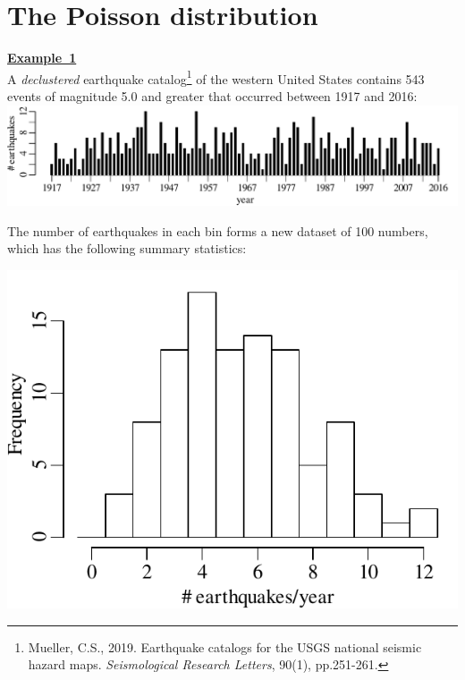 \chapter{The Poisson distribution}
\label{ch:poisson}

\textbf{\underline{Example~1}}\\

A \emph{declustered} earthquake catalog\footnote{Mueller, C.S.,
  2019. Earthquake catalogs for the USGS national seismic hazard
  maps. \textit{Seismological Research Letters}, 90(1), pp.251-261.}
of the western United States contains 543 events of magnitude 5.0 and
greater that occurred between 1917 and 2016:\\

\noindent\includegraphics[width=\textwidth]{../figures/declusteredquakes.pdf}
\begingroup {}
\label{fig:declusteredquakes}
\endgroup

The number of earthquakes in each bin forms a new dataset of 100
numbers, which has the following summary statistics:

\noindent\begin{minipage}[t][][b]{.35\textwidth}
  \includegraphics[width=\textwidth]{../figures/declusteredquakesperyear.pdf}\\
\end{minipage}
\begin{minipage}[t][][t]{.65\textwidth}
  \label{fig:declusteredquakesperyear}
\end{minipage}

